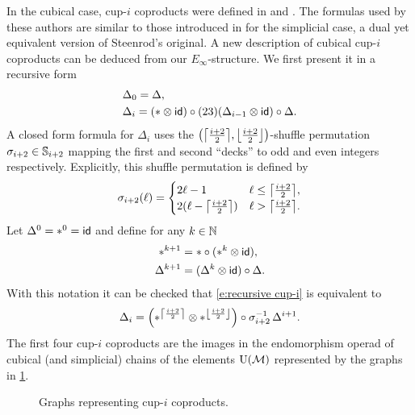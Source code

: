 In the cubical case, cup-$i$ coproducts were defined in \cite{kadeishvili1999coproducts} and \cite{pilarczyk2016cubical}.
The formulas used by these authors are similar to those introduced in \cite{medina2022fast_sq} for the simplicial case, a dual yet equivalent version of Steenrod's original.
A new description of cubical cup-$i$ coproducts can be deduced from our $E_\infty$-structure.
We first present it in a recursive form
\begin{equation} \label{e:recursive cup-i}
	\begin{split}
		& \Delta_0 = \Delta, \\
		& \Delta_i =
		(\ast \ot \id) \circ (23)(\Delta_{i-1} \ot \id) \circ \Delta.
	\end{split}
\end{equation}
A closed form formula for $\Delta_i$ uses the $\big(\ceil*{\frac{i+2}{2}}, \floor*{\frac{i+2}{2}}\big)$-shuffle permutation $\sigma_{i+2} \in \sym_{i+2}$ mapping the first and second ``decks'' to odd and even integers respectively.
Explicitly, this shuffle permutation is defined by
\begin{equation} \label{e:shuffle perm}
	\sigma_{i+2}(\ell) =
	\begin{cases}
		2\ell-1 & \ell \leq \ceil*{\frac{i+2}{2}}, \\
		2(\ell-\ceil*{\frac{i+2}{2}}) & \ell > \ceil*{\frac{i+2}{2}}.
	\end{cases}
\end{equation}
Let $\Delta^0 = \ast^0 = \id$ and define for any $k \in \N$
\begin{equation} \label{e:iterated comb}
	\begin{split}
		\ast^{k+1} &= \ast \circ (\ast^k \ot \id), \\
		\Delta^{k+1} &= (\Delta^k \ot \id) \circ \Delta.
	\end{split}
\end{equation}
With this notation it can be checked that \cref{e:recursive cup-i} is equivalent to
\begin{equation} \label{e:closed cup-i}
	\Delta_i = \left(\ast^{\ceil*{\frac{i+2}{2}}} \ot \ast^{\floor*{\frac{i+2}{2}}}\right) \circ \sigma_{i+2}^{-1} \, \Delta^{i+1}.
\end{equation}
The first four cup-$i$ coproducts are the images in the endomorphism operad of cubical (and simplicial) chains of the elements $\UM$ represented by the graphs in \cref{f:cup-i}.

\begin{figure}[h!]
	\centering
	
	\caption{Graphs representing cup-$i$ coproducts.}
	\label{f:cup-i}
\end{figure}

